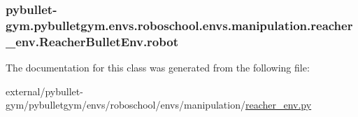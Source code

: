 \subsubsection[{\texorpdfstring{robot}{robot}}]{\setlength{\rightskip}{0pt plus 5cm}pybullet-\/gym.\+pybulletgym.\+envs.\+roboschool.\+envs.\+manipulation.\+reacher\+\_\+env.\+Reacher\+Bullet\+Env.\+robot}\hypertarget{classpybullet-gym_1_1pybulletgym_1_1envs_1_1roboschool_1_1envs_1_1manipulation_1_1reacher__env_1_1_reacher_bullet_env_aeac396c543165fac3b281ee04441690b}{}\label{classpybullet-gym_1_1pybulletgym_1_1envs_1_1roboschool_1_1envs_1_1manipulation_1_1reacher__env_1_1_reacher_bullet_env_aeac396c543165fac3b281ee04441690b}


The documentation for this class was generated from the following file\+:\begin{DoxyCompactItemize}
\item 
external/pybullet-\/gym/pybulletgym/envs/roboschool/envs/manipulation/\hyperlink{roboschool_2envs_2manipulation_2reacher__env_8py}{reacher\+\_\+env.\+py}\end{DoxyCompactItemize}
